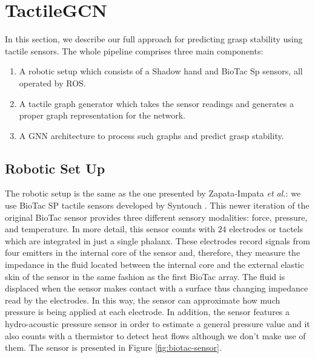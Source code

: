\section{TactileGCN}
\label{cha:tactile:sec:tactilegcn}

In this section, we describe our full approach for predicting grasp stability using tactile sensors. The whole pipeline comprises three main components:

\begin{enumerate}
    \item A robotic setup which consists of a Shadow hand and BioTac Sp sensors, all operated by \ac{ROS}.
    \item A tactile graph generator which takes the sensor readings and generates a proper graph representation for the network.
    \item A \ac{GNN} architecture to process such graphs and predict grasp stability.
\end{enumerate}

\subsection{Robotic Set Up}
\label{cha:tactile:sec:tactilegcn:subsec:rpobotic-set-up}

The robotic setup is the same as the one presented by Zapata-Impata \emph{et al.}\cite{Zapata2018}: we use BioTac SP tactile sensors developed by Syntouch \cite{Syntouch2018}. This newer iteration of the original BioTac sensor provides three different sensory modalities: force, pressure, and temperature. In more detail, this sensor counts with $24$ electrodes or tactels which are integrated in just a single phalanx. These electrodes record signals from four emitters in the internal core of the sensor and, therefore, they measure the impedance in the fluid located between the internal core and the external elastic skin of the sensor in the same fashion as the first BioTac array. The fluid is displaced when the sensor makes contact with a surface thus changing impedance read by the electrodes. In this way, the sensor can approximate how much pressure is being applied at each electrode. In addition, the sensor features a hydro-acoustic pressure sensor in order to estimate a general pressure value and it also counts with a thermistor to detect heat flows although we don't make use of them. The sensor is presented in Figure \ref{fig:biotac-sensor}.

